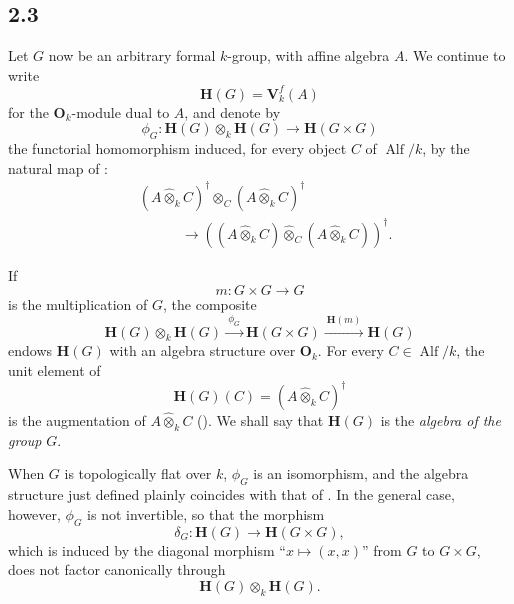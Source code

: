 
\subsection*{2.3}
\label{sga3:VIIB:2.3}

Let \(G\) now be an arbitrary formal \(k\)-group, with affine algebra \(A\). We
continue to write
\[
  \mathbf H(G)=\mathbf V_k^f(A)
\]
for the \(\mathbf O_k\)-module dual to \(A\), and denote by
\[
  \phi_G:
  \mathbf H(G)\otimes_k\mathbf H(G)
  \longrightarrow
  \mathbf H(G\times G)
\]
the functorial homomorphism induced, for every object \(C\) of
\(\operatorname{Alf}/k\), by the natural map of :
\[
\begin{aligned}
  &(A\widehat\otimes_kC)^\dagger
  \otimes_C
  (A\widehat\otimes_kC)^\dagger
  \\
  &\hspace{3em}\longrightarrow
  \left(
    (A\widehat\otimes_kC)
    \widehat\otimes_C
    (A\widehat\otimes_kC)
  \right)^\dagger.
\end{aligned}
\]

If
\[
  m:G\times G\longrightarrow G
\]
is the multiplication of \(G\), the composite
\[
  \mathbf H(G)\otimes_k\mathbf H(G)
  \xrightarrow{\ \phi_G\ }
  \mathbf H(G\times G)
  \xrightarrow{\ \mathbf H(m)\ }
  \mathbf H(G)
\]
endows \(\mathbf H(G)\) with an algebra structure over
\(\mathbf O_k\). For every
\(C\in\operatorname{Alf}/k\), the unit element of
\[
  \mathbf H(G)(C)
  =
  (A\widehat\otimes_kC)^\dagger
\]
is the augmentation of \(A\widehat\otimes_kC\) \textup{()}. We shall
say that \(\mathbf H(G)\) is the \emph{algebra of the group} \(G\).

When \(G\) is topologically flat over \(k\), \(\phi_G\) is an
isomorphism, and the algebra structure just defined plainly coincides
with that of . In the general case, however, \(\phi_G\) is
not invertible, so that the morphism
\[
  \delta_G:
  \mathbf H(G)\longrightarrow\mathbf H(G\times G),
\]
which is induced by the diagonal morphism ``\(x\mapsto(x,x)\)'' from
\(G\) to \(G\times G\), does not factor canonically through
\[
  \mathbf H(G)\otimes_k\mathbf H(G).
\]
